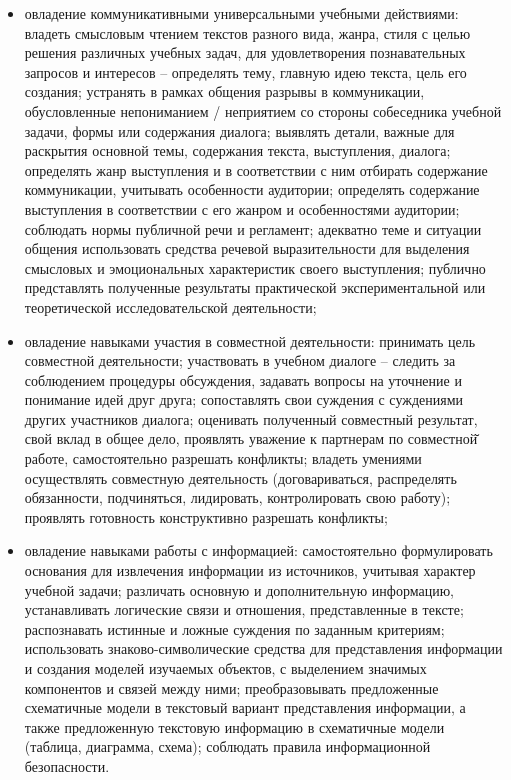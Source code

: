 \documentclass[
  11pt,
]{book}
\begin{document}
\begin{itemize}
\item
  овладение коммуникативными универсальными учебными действиями: владеть смысловым чтением текстов разного вида, жанра, стиля с целью решения различных учебных задач, для удовлетворения познавательных запросов и интересов -- определять тему, главную идею текста, цель его создания; устранять в рамках общения разрывы в коммуникации, обусловленные непониманием / неприятием со стороны собеседника учебной задачи, формы или содержания диалога; выявлять детали, важные для раскрытия основной темы, содержания текста, выступления, диалога; определять жанр выступления и в соответствии с ним отбирать содержание коммуникации, учитывать особенности аудитории; определять содержание выступления в соответствии с его жанром и особенностями аудитории; соблюдать нормы публичной речи и регламент; адекватно теме и ситуации общения использовать средства речевой выразительности для выделения смысловых и эмоциональных характеристик своего выступления; публично представлять полученные результаты практической экспериментальной или теоретической исследовательской деятельности;
\item
  овладение навыками участия в совместной деятельности: принимать цель совместной деятельности; участвовать в учебном диалоге -- следить за соблюдением процедуры обсуждения, задавать вопросы на уточнение и понимание идей друг друга; сопоставлять свои суждения с суждениями других участников диалога; оценивать полученный совместный результат, свой вклад в общее дело, проявлять уважение к партнерам по совместной̆ работе, самостоятельно разрешать конфликты; владеть умениями осуществлять совместную деятельность (договариваться, распределять обязанности, подчиняться, лидировать, контролировать свою работу); проявлять готовность конструктивно разрешать конфликты;
\item
  овладение навыками работы с информацией: самостоятельно формулировать основания для извлечения информации из источников, учитывая характер учебной задачи; различать основную и дополнительную информацию, устанавливать логические связи и отношения, представленные в тексте; распознавать истинные и ложные суждения по заданным критериям; использовать знаково-символические средства для представления информации и создания моделей изучаемых объектов, с выделением значимых компонентов и связей между ними; преобразовывать предложенные схематичные модели в текстовый вариант представления информации, а также предложенную текстовую информацию в схематичные модели (таблица, диаграмма, схема); соблюдать правила информационной безопасности.
\end{itemize}
\end{document}
